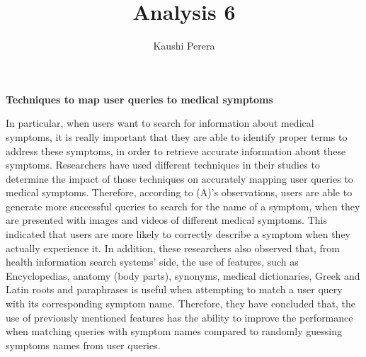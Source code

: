 \documentclass[]{article}
\title{Analysis 6}
\author{Kaushi Perera}
\begin{document}
\maketitle


\textbf{Techniques to map user queries to medical symptoms}


In particular, when users want to search for information about medical symptoms, it is really important that they are able to identify proper terms to address these symptoms, in order to retrieve accurate information about these symptoms. Researchers have used different techniques in their studies to determine the impact of those techniques on accurately mapping user queries to medical symptoms. Therefore, according to (A)'s observations, users are able to generate more successful queries to search for the name of a symptom, when they are presented with images and videos of different medical symptoms. This indicated that users are more likely to correctly describe a symptom when they actually experience it. In addition, these researchers also observed that, from health information search systems' side, the use of features, such as Encyclopedias, anatomy (body parts), synonyms, medical dictionaries, Greek and Latin roots and paraphrases is useful when attempting to match a user query with its corresponding symptom name. Therefore, they have concluded that, the use of previously mentioned features has the ability to improve the performance when matching queries with symptom names compared to randomly guessing symptoms names from user queries.
\end{document}
